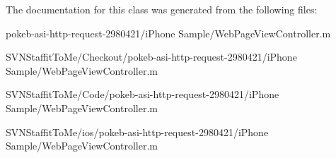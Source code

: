 \-The documentation for this class was generated from the following files\-:\begin{DoxyCompactItemize}
\item 
pokeb-\/asi-\/http-\/request-\/2980421/i\-Phone Sample/\-Web\-Page\-View\-Controller.\-m\item 
\-S\-V\-N\-Staffit\-To\-Me/\-Checkout/pokeb-\/asi-\/http-\/request-\/2980421/i\-Phone Sample/\-Web\-Page\-View\-Controller.\-m\item 
\-S\-V\-N\-Staffit\-To\-Me/\-Code/pokeb-\/asi-\/http-\/request-\/2980421/i\-Phone Sample/\-Web\-Page\-View\-Controller.\-m\item 
\-S\-V\-N\-Staffit\-To\-Me/ios/pokeb-\/asi-\/http-\/request-\/2980421/i\-Phone Sample/\-Web\-Page\-View\-Controller.\-m\end{DoxyCompactItemize}
